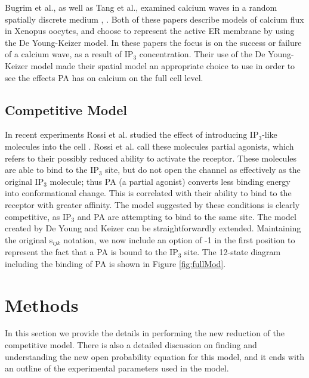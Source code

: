 \documentclass[preprint,12pt]{elsarticle}
\begin{document}
Bugrim et al., as well as Tang et al., examined calcium waves in a random spatially discrete medium \cite{bug}, \cite{tang}. Both of these papers describe models of calcium flux in Xenopus oocytes, and choose to represent the active ER membrane by using the De Young-Keizer model. In these papers the focus is on the success or failure of a calcium wave, as a result of IP$_3$ concentration. Their use of the De Young-Keizer model made their spatial model an appropriate choice to use in order to see the effects PA has on calcium on the full cell level.

\subsection{Competitive Model}
In recent experiments Rossi et al. studied the effect of introducing IP$_3$-like molecules into the cell \cite{rossi}. Rossi et al. call these molecules partial agonists, which refers to their possibly reduced ability to activate the receptor. These molecules are able to bind to the IP$_3$ site, but do not open the channel as effectively as the original IP$_3$ molecule; thus PA (a partial agonist) converts less binding energy into conformational change. This is correlated with their ability to bind to the receptor with greater affinity. The model suggested by these conditions is clearly competitive, as IP$_3$ and PA are attempting to bind to the same site. The model created by De Young and Keizer can be straightforwardly extended. Maintaining the original s$_{ijk}$ notation, we now include an option of -1 in the first position to represent the fact that a PA is bound to the IP$_3$ site. The 12-state diagram including the binding of PA is shown in Figure \ref{fig:fullMod}. 


\section{Methods}
In this section we provide the details in performing the new reduction of the competitive model. There is also a detailed discussion on finding and understanding the new open probability equation for this model, and it ends with an outline of the experimental parameters used in the model.
\end{document}
